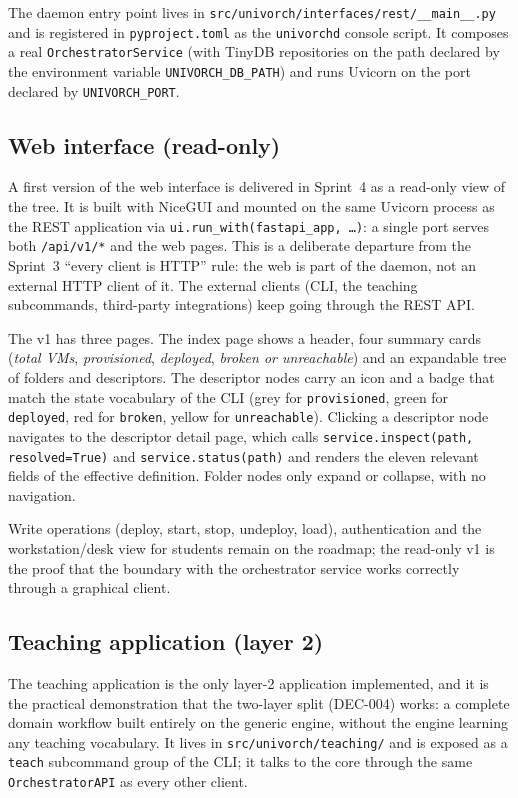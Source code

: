 The daemon entry point lives in
\texttt{src/univorch/interfaces/rest/\_\_main\_\_.py} and is
registered in \texttt{pyproject.toml} as the \texttt{univorchd}
console script. It composes a real \texttt{OrchestratorService} (with
TinyDB repositories on the path declared by the environment
variable \texttt{UNIVORCH\_DB\_PATH}) and runs Uvicorn on the port
declared by \texttt{UNIVORCH\_PORT}.

\subsection{Web interface (read-only)}

A first version of the web interface is delivered in Sprint~4 as a
read-only view of the tree. It is built with NiceGUI and mounted on
the same Uvicorn process as the REST application via
\texttt{ui.run\_with(fastapi\_app, \dots)}: a single port serves both
\texttt{/api/v1/*} and the web pages. This is a deliberate departure
from the Sprint~3 ``every client is HTTP'' rule: the web is part of
the daemon, not an external HTTP client of it. The external clients
(CLI, the teaching subcommands, third-party integrations) keep
going through the REST API.

The v1 has three pages. The index page shows a header, four summary
cards (\emph{total VMs}, \emph{provisioned}, \emph{deployed},
\emph{broken or unreachable}) and an expandable tree of folders and
descriptors. The descriptor nodes carry an icon and a badge that
match the state vocabulary of the CLI (grey for
\texttt{provisioned}, green for \texttt{deployed}, red for
\texttt{broken}, yellow for \texttt{unreachable}). Clicking a
descriptor node navigates to the descriptor detail page, which
calls \texttt{service.inspect(path, resolved=True)} and
\texttt{service.status(path)} and renders the eleven relevant
fields of the effective definition. Folder nodes only expand or
collapse, with no navigation.

Write operations (deploy, start, stop, undeploy, load),
authentication and the workstation/desk view for students remain on
the roadmap; the read-only v1 is the proof that the boundary with
the orchestrator service works correctly through a graphical client.

\subsection{Teaching application (layer 2)}

The teaching application is the only layer-2 application implemented,
and it is the practical demonstration that the two-layer split
(DEC-004) works: a complete domain workflow built entirely on the
generic engine, without the engine learning any teaching vocabulary.
It lives in \texttt{src/univorch/teaching/} and is exposed as a
\texttt{teach} subcommand group of the CLI; it talks to the core
through the same \texttt{OrchestratorAPI} as every other client.

